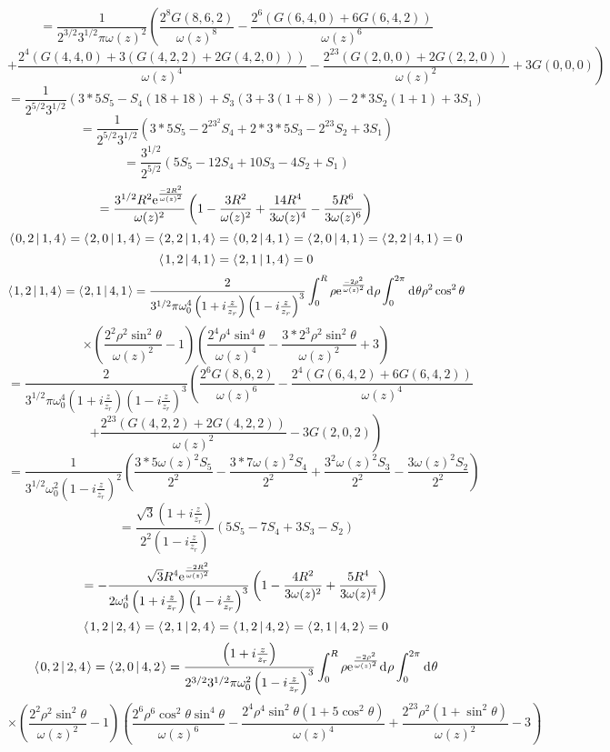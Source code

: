 \documentclass[11pt]{amsart}
\makeatletter
\newcommand{\e}{{\rm e}}				%
\newcommand{\msp}[1]{\mspace{#1mu}}		%
\newcommand{\0}{\varnothing}		%
\newcommand{\dd}{\msp{1} {\rm{d}} \msp{1}}	%
\newcommand{\brac}[2]{\left\langle\msp{2} #1\left\lvert \msp{3.5} #2 \right.\right\rangle}	%
\newcommand{\1}{!}
\newcommand{\2}{@}
\newcommand{\3}{\#}
\newcommand{\4}{\$}
\newcommand{\5}{\%}
\newcommand{\6}{$^\wedge$}
\newcommand{\7}{\&}
\newcommand{\8}{*}
\newcommand{\9}{(}
\makeatother
\begin{document}
\[
=\frac{1}{2^{3/2}3^{1/2}\pi \omega(z)^2}\left(\frac{2^8G(8,6,2)}{\omega(z)^8}-\frac{2^6\left(G(6,4,0)+6G(6,4,2)\right)}{\omega(z)^6}\right.
\]
\[
\left.+\frac{2^4\left(G(4,4,0)+3\left(G(4,2,2)+2G(4,2,0)\right)\right)}{\omega(z)^4}-\frac{2^23\left(G(2,0,0)+2G(2,2,0)\right)}{\omega(z)^2}+3G(0,0,0)\right)
\]
\[
=\frac{1}{2^{5/2}3^{1/2}}\left(3*5S_5-S_4\left(18+18\right)+S_3\left(3+3\left(1+8\right)\right)-2*3S_2\left(1+1\right)+3S_1\right)
\]
\[
=\frac{1}{2^{5/2}3^{1/2}}\left(3*5S_5-2^23^2S_4+2*3*5S_3-2^23S_2+3S_1\right)
\]
\[
=\frac{3^{1/2}}{2^{5/2}}\left(5S_5-12S_4+10S_3-4S_2+S_1\right)
\]
\[
=\frac{3^{1/2}R^2\e^{\frac{-2R^2}{\omega(z)^2}}}{\omega(z)^2}\left(1-\frac{3R^2}{\omega(z)^2}+\frac{14R^4}{3\omega(z)^4}-
\frac{5R^6}{3\omega(z)^6}\right)
\]
\[
\brac{0,2}{1,4} = \brac{2,0}{1,4} = \brac{2,2}{1,4} = \brac{0,2}{4,1} = \brac{2,0}{4,1} = \brac{2,2}{4,1} = 0
\]
\[
\brac{1,2}{4,1} = \brac{2,1}{1,4} = 0
\]
\[
\brac{1,2}{1,4} = \brac{2,1}{4,1} = \frac{2}{3^{1/2}\pi\omega_0^4\left(1+i\frac{z}{z_r}\right)\left(1-i\frac{z}{z_r}\right)^3}\int_0^R\rho \e^{\frac{-2\rho^2}{\omega(z)^2}}\dd \rho \int_0^{2\pi}\dd \theta\rho^2 \cos^2 \theta
\]
\[
\times\left(\frac{2^2\rho^2\sin^2\theta}{\omega(z)^2}-1\right)\left(\frac{2^4\rho^4\sin^4\theta}{\omega(z)^4}-\frac{3*2^3\rho^2\sin^2\theta}{\omega(z)^2}+3\right)
\]
\[
=\frac{2}{3^{1/2}\pi \omega_0^4\left(1+i\frac{z}{z_r}\right)\left(1-i\frac{z}{z_r}\right)^3}\left(\frac{2^6G(8,6,2)}{\omega(z)^6}-\frac{2^4\left(G(6,4,2)+6G(6,4,2)\right)}{\omega(z)^4}\right.
\]
\[
\left.+\frac{2^23\left(G(4,2,2)+2G(4,2,2)\right)}{\omega(z)^2}-3G(2,0,2)\right)
\]
\[
=\frac{1}{3^{1/2}\omega_0^2\left(1-i\frac{z}{z_r}\right)^2}\left(\frac{3*5\omega(z)^2S_5}{2^2}-\frac{3*7\omega(z)^2S_4}{2^2}+\frac{3^2\omega(z)^2S_3}{2^2}-\frac{3\omega(z)^2S_2}{2^2}\right)
\]
\[
=\frac{\sqrt{3}\left(1+i\frac{z}{z_r}\right)}{2^2\left(1-i\frac{z}{z_r}\right)}\left(5S_5-7S_4+3S_3-S_2\right)
\]
\[
=-\frac{\sqrt{3}R^4\e^{\frac{-2R^2}{\omega(z)^2}}}{2\omega_0^4\left(1+i\frac{z}{z_r}\right)\left(1-i\frac{z}{z_r}\right)^3}\left(1-\frac{4R^2}{3\omega(z)^2}+\frac{5R^4}{3\omega(z)^4}\right)
\]
\[
\brac{1,2}{2,4} = \brac{2,1}{2,4} = \brac{1,2}{4,2} = \brac{2,1}{4,2} = 0
\]
\[
\brac{0,2}{2,4} = \brac{2,0}{4,2} = \frac{\left(1+i\frac{z}{z_r}\right)}{2^{3/2}3^{1/2}\pi\omega_0^2\left(1-i\frac{z}{z_r}\right)^3}\int_0^R \rho \e^{\frac{-2\rho^2}{\omega(z)^2}}\dd \rho \int_0^{2\pi}\dd \theta
\]
\[
\times\left(\frac{2^2\rho^2\sin^2\theta}{\omega(z)^2}-1\right)\left(\frac{2^6\rho^6\cos^2\theta\sin^4\theta}{\omega(z)^6}-\frac{2^4\rho^4\sin^2\theta\left(1+5\cos^2\theta\right)}{\omega(z)^4}+\frac{2^23\rho^2\left(1+\sin^2\theta\right)}{\omega(z)^2}-3\right)
\]
\end{document}
